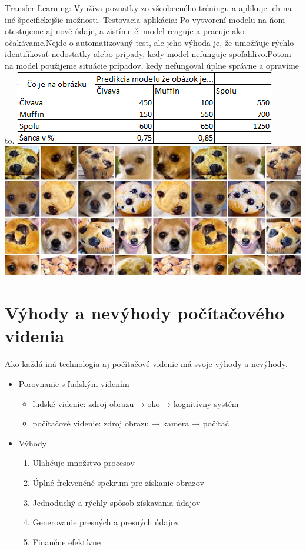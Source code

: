 \documentclass[10pt,twoside,slovak,a4paper]{coursepaper}
\begin{document}
Transfer Learning: Využíva poznatky zo všeobecného tréningu a aplikuje ich na iné špecifickejšie možnosti.
Testovacia aplikácia: Po vytvorení modelu na ňom otestujeme aj nové údaje, a zistíme či model reaguje a pracuje ako očakávame.Nejde o automatizovaný test, ale jeho výhoda je, že umožňuje rýchlo identifikovať nedostatky alebo prípady, kedy model nefunguje spoľahlivo.Potom na model použijeme situácie prípadov, kedy nefungoval úplne správne a opravíme to.\cite{CV-framework}
\includegraphics[scale=1]{tabulka.png}
\includegraphics[scale=0.5]{civava_vs_muffin.jpeg}
\cite{Conditional-Probability}
\centering




\section{Výhody a nevýhody počítačového videnia} \label{ina}
Ako každá iná technologia aj počítačové videnie má svoje výhody a nevýhody.
\begin{itemize}
\item Porovnanie s ľudským videním
	\begin{itemize}
	\item ľudské videnie: zdroj obrazu → oko → kognitívny systém
	\item počítačové videnie: zdroj obrazu → kamera → počítač
	\end{itemize}
\end{itemize}

\begin{itemize}
\item Výhody
	\begin{enumerate}
	\item Uľahčuje množstvo procesov
	\item Úplné frekvenčné spekrum pre získanie obrazov
	\item Jednoduchý a rýchly spôsob získavania údajov
	\item Generovanie presných a presných údajov
	\item Finančne efektívne
	\end{enumerate}
\end{itemize}
\end{document}
